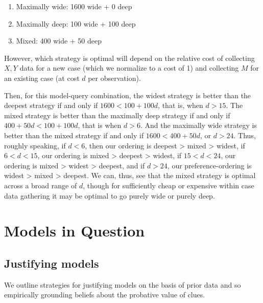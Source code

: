 \documentclass[
  12pt,
]{book}
\providecommand{\tightlist}{%
  \setlength{\itemsep}{0pt}\setlength{\parskip}{0pt}}
\newenvironment{headerbox}{
  \definecolor{shadecolor}{rgb}{0.8, 0.8, 0.8}  %
  \color{black}
  \begin{shaded}}{\end{shaded}}
\begin{document}
\begin{enumerate}
\def\labelenumi{\arabic{enumi}.}
\tightlist
\item
  Maximally wide: 1600 wide + 0 deep
\item
  Maximally deep: 100 wide + 100 deep
\item
  Mixed: 400 wide + 50 deep
\end{enumerate}

However, which strategy is optimal will depend on the relative cost of collecting \(X,Y\) data for a new case (which we normalize to a cost of 1) and collecting \(M\) for an existing case (at cost \(d\) per observation).

Then, for this model-query combination, the widest strategy is better than the deepest strategy if and only if \(1600 < 100 + 100d\), that is, when \(d > 15\). The mixed strategy is better than the maximally deep strategy if and only if \(400 + 50d < 100 + 100d\), that is when \(d > 6\). And the maximally wide strategy is better than the mixed strategy if and only if \(1600 < 400 + 50d\), or \(d > 24\). Thus, roughly speaking, if \(d < 6\), then our ordering is deepest \textgreater{} mixed \textgreater{} widest, if \(6 < d < 15\), our ordering is mixed \textgreater{} deepest \textgreater{} widest, if \(15 < d < 24\), our ordering is mixed \textgreater{} widest \textgreater{} deepest, and if \(d > 24\), our preference-ordering is widest \textgreater{} mixed \textgreater{} deepest. We can, thus, see that the mixed strategy is optimal across a broad range of \(d\), though for sufficiently cheap or expensive within case data gathering it may be optimal to go purely wide or purely deep.

\hypertarget{part-models-in-question}{%
\part{Models in Question}\label{part-models-in-question}}

\hypertarget{justifying}{%
\chapter{Justifying models}\label{justifying}}

\begin{headerbox}
We outline strategies for justifying models on the basis of prior data and so empirically grounding beliefs about the probative value of clues.

\end{headerbox}
\end{document}
